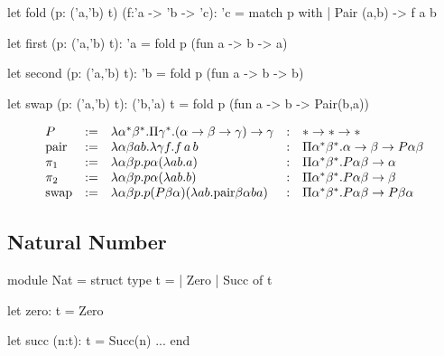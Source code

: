 \begin{ocaml}
  let fold (p: ('a,'b) t) (f:'a -> 'b -> 'c): 'c =
    match p with
    | Pair (a,b) -> f a b
\end{ocaml}

\begin{ocaml}
  let first (p: ('a,'b) t): 'a =
    fold p (fun a -> b -> a)

  let second (p: ('a,'b) t): 'b =
    fold p (fun a -> b -> b)
\end{ocaml}

\begin{ocaml}
  let swap (p: ('a,'b) t): ('b,'a) t =
    fold p (fun a -> b -> Pair(b,a))
\end{ocaml}

$$
%
\begin{array}{lllll}
  \Pair
  &:=
  & \lambda \alpha^* \beta^* .
    \Pi \gamma^* . (\alpha \to \beta \to \gamma)
    \to \gamma
  &:
  & * \to * \to *

  \\

  \pair
  &:=
  & \lambda \alpha \beta a b . \lambda \gamma f . f \, a \, b
  &:
  & \Pi \alpha^* \beta^* . \alpha \to \beta \to \Pair\alpha\beta

  \\

  \pi_1
  &:=
  & \lambda \alpha \beta p. p \alpha (\lambda a b .a)
  &:
  &\Pi \alpha^* \beta^* . \Pair\alpha\beta \to \alpha

  \\

  \pi_2
  &:=
  & \lambda \alpha \beta p. p \alpha (\lambda a b .b)
  &:
  &\Pi \alpha^* \beta^* . \Pair\alpha\beta \to \beta

  \\

  \text{swap}
  &:=
  & \lambda\alpha\beta p.
    p (\Pair\beta\alpha) (\lambda a b . \pair\beta\alpha b a)
  &:
  &\Pi \alpha^* \beta^* . \Pair\alpha\beta \to \Pair\beta\alpha
\end{array}
$$


\subsection{Natural Number}

\begin{ocaml}
  module Nat =
    struct
      type t =
      | Zero
      | Succ of t

      let zero: t =
        Zero

      let succ (n:t): t =
        Succ(n)
      ...
    end
\end{ocaml}


